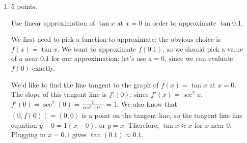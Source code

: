 \documentclass{article}
\begin{document}
\begin{enumerate}
\begin{enumerate}
    \item
      \begin{problem}[\vfill]
        $\dfrac{d}{dx} (\cot x) = - \csc^2 x$
      \end{problem}

      \begin{solution}
        We can rewrite $\cot x = \frac{\cos x}{\sin x}$ and use the
        Quotient Rule:
        \begin{align*}
          \frac{d}{dx} (\cot x) &= \frac{d}{dx} \left( \frac{\cos x}{\sin
              x} \right) \\
          &= \frac{(\sin x)(-\sin x) - (\cos x) (\cos x)}{(\sin x)^2} \\
          &= \frac{ - (\sin^2 x + \cos^2 x)}{\sin^2 x} \\
          &= - \frac{1}{\sin^2 x} \\
          &= - \csc^2 x
        \end{align*}
      \end{solution}

    \end{enumerate}
    \probonly{}


\item 

\begin{grading}
5 points.
\end{grading}

  \begin{problem}[\vfill\newpage]
    Use linear approximation of $\tan x$ at $x=0$ in order
    to approximate $\tan 0.1$.
  \end{problem}

  \begin{solution}
    We first need to pick a function to approximate; the obvious choice is
    $f(x) = \tan x$.  We want to approximate $f(0.1)$, so we should pick a
    value of $a$ near $0.1$ for our approximation; let's use $a = 0$,
    since we can evaluate $f(0)$ exactly.

    We'd like to find the line tangent to the graph of $f(x) = \tan x$ at
    $x = 0$.  The slope of this tangent line is $f'(0)$; since $f'(x) =
    \sec^2 x$, $f'(0) = \sec^2 (0) = \frac{1}{\cos^2 (0)} = 1$.  We also
    know that $(0, f(0)) = (0, 0)$ is a point on the tangent line, so the
    tangent line has equation $y - 0 = 1 (x - 0)$, or $y = x$.  Therefore,
    $\tan x \approx x$ for $x$ near 0.  Plugging in $x = 0.1$ gives $\tan
    (0.1) \approx \boxed{0.1}$.    
  \end{solution}


\end{enumerate}
\end{document}

